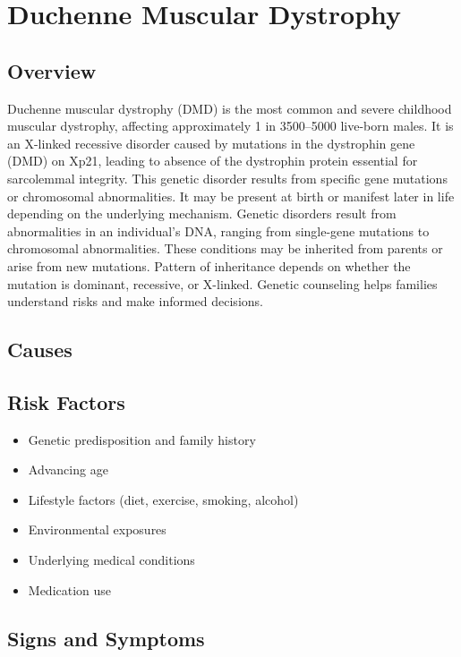 \chapter{Duchenne Muscular Dystrophy}
\label{sec:Duchenne Muscular Dystrophy}

\section{Overview}
Duchenne muscular dystrophy (DMD) is the most common and severe childhood muscular dystrophy, affecting approximately 1 in 3500--5000 live-born males. It is an X-linked recessive disorder caused by mutations in the dystrophin gene (DMD) on Xp21, leading to absence of the dystrophin protein essential for sarcolemmal integrity. This genetic disorder results from specific gene mutations or chromosomal abnormalities. It may be present at birth or manifest later in life depending on the underlying mechanism. Genetic disorders result from abnormalities in an individual's DNA, ranging from single-gene mutations to chromosomal abnormalities. These conditions may be inherited from parents or arise from new mutations. Pattern of inheritance depends on whether the mutation is dominant, recessive, or X-linked. Genetic counseling helps families understand risks and make informed decisions.
\section{Causes}
\section{Risk Factors}

\begin{itemize}[noitemsep]
  \item Genetic predisposition and family history
  \item Advancing age
  \item Lifestyle factors (diet, exercise, smoking, alcohol)
  \item Environmental exposures
  \item Underlying medical conditions
  \item Medication use
\end{itemize}
\section{Signs and Symptoms}

